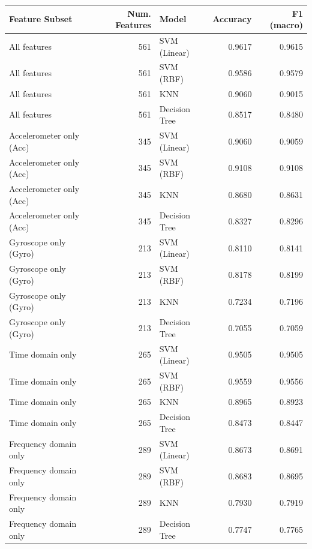 \begin{tabular}{lrlrr}
\toprule
Feature Subset & Num. Features & Model & Accuracy & F1 (macro) \\
\midrule
All features & 561 & SVM (Linear) & 0.9617 & 0.9615 \\
All features & 561 & SVM (RBF) & 0.9586 & 0.9579 \\
All features & 561 & KNN & 0.9060 & 0.9015 \\
All features & 561 & Decision Tree & 0.8517 & 0.8480 \\
Accelerometer only (Acc) & 345 & SVM (Linear) & 0.9060 & 0.9059 \\
Accelerometer only (Acc) & 345 & SVM (RBF) & 0.9108 & 0.9108 \\
Accelerometer only (Acc) & 345 & KNN & 0.8680 & 0.8631 \\
Accelerometer only (Acc) & 345 & Decision Tree & 0.8327 & 0.8296 \\
Gyroscope only (Gyro) & 213 & SVM (Linear) & 0.8110 & 0.8141 \\
Gyroscope only (Gyro) & 213 & SVM (RBF) & 0.8178 & 0.8199 \\
Gyroscope only (Gyro) & 213 & KNN & 0.7234 & 0.7196 \\
Gyroscope only (Gyro) & 213 & Decision Tree & 0.7055 & 0.7059 \\
Time domain only & 265 & SVM (Linear) & 0.9505 & 0.9505 \\
Time domain only & 265 & SVM (RBF) & 0.9559 & 0.9556 \\
Time domain only & 265 & KNN & 0.8965 & 0.8923 \\
Time domain only & 265 & Decision Tree & 0.8473 & 0.8447 \\
Frequency domain only & 289 & SVM (Linear) & 0.8673 & 0.8691 \\
Frequency domain only & 289 & SVM (RBF) & 0.8683 & 0.8695 \\
Frequency domain only & 289 & KNN & 0.7930 & 0.7919 \\
Frequency domain only & 289 & Decision Tree & 0.7747 & 0.7765 \\
\bottomrule
\end{tabular}
